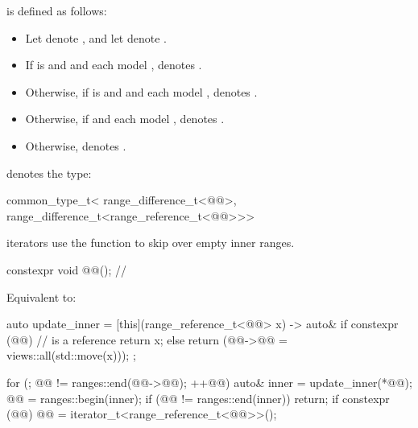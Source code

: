 \pnum
{} is defined as follows:
\begin{itemize}
\item Let  denote
  , and
  let  denote
  .
\item If  is  and
   and  each model
  , 
  denotes .
\item Otherwise, if  is  and
   and  each model
  , 
  denotes .
\item Otherwise, if  and  each model
  ,
   denotes .
\item Otherwise,  denotes .
\end{itemize}

\pnum
{} denotes the type:
\begin{codeblock}
common_type_t<
  range_difference_t<@@>,
  range_difference_t<range_reference_t<@@>>>
\end{codeblock}

\pnum
{} iterators use the  function to skip over
empty inner ranges.

\begin{itemdecl}
constexpr void @@();       // \expos
\end{itemdecl}

\begin{itemdescr}
\pnum
\effects
Equivalent to:
\begin{codeblock}
auto update_inner = [this](range_reference_t<@@> x) -> auto& {
  if constexpr (@@) //  is a reference
    return x;
  else
    return (@@->@@ = views::all(std::move(x)));
};

for (; @@ != ranges::end(@@->@@); ++@@) {
  auto& inner = update_inner(*@@);
  @@ = ranges::begin(inner);
  if (@@ != ranges::end(inner))
    return;
}
if constexpr (@@)
  @@ = iterator_t<range_reference_t<@@>>();
\end{codeblock}
\end{itemdescr}

